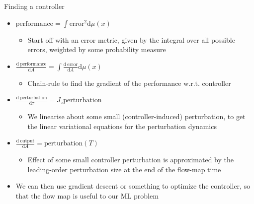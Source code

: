 \documentclass[presentation]{beamer}
\begin{document}
\begin{frame}[label={sec:org7a5984c},plain]{Finding a controller}
\begin{itemize}
\item \(\mathrm{performance} = \int \mathrm{error}^2 \mathrm{d}\mu(x)\)
\begin{itemize}
\item Start off with an error metric, given by the integral over all possible errors, weighted by some probability measure
\end{itemize}

\item \(\frac{\mathrm{d~performance}}{\mathrm{d}A} = \int \frac{\mathrm{d~error}}{\mathrm{d}A} \mathrm{d}\mu(x)\)
\begin{itemize}
\item Chain-rule to find the gradient of the performance w.r.t. controller
\end{itemize}

\item \(\frac{\mathrm{d~perturbation}}{\mathrm{d}\tau} = J_z \mathrm{perturbation}\)
\begin{itemize}
\item We linearise about some small (controller-induced) perturbation, to get the linear variational equations for the perturbation dynamics
\end{itemize}

\item \(\frac{\mathrm{d~output}}{\mathrm{d}A} = \mathrm{perturbation}(T)\)
\begin{itemize}
\item Effect of some small controller perturbation is approximated by the leading-order perturbation size at the end of the flow-map time
\end{itemize}

\item \alert{We can then use gradient descent or something to optimize the controller, so that the flow map is useful to our ML problem}
\end{itemize}
\end{frame}
\end{document}
